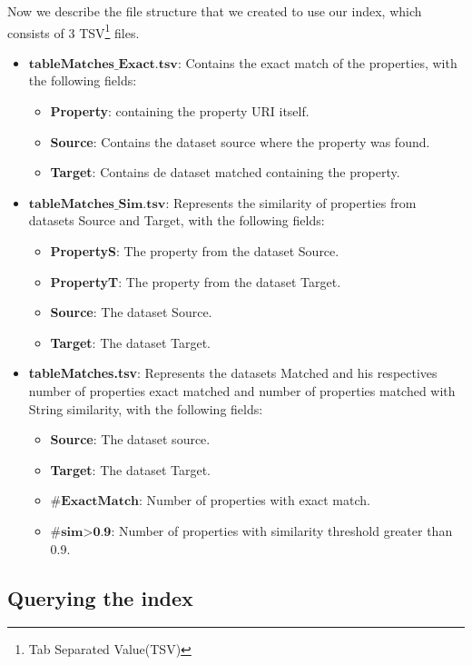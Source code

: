 Now we describe the file structure that we created to use our index, which consists of 3 TSV\footnote{Tab Separated Value(TSV)} files.
\begin{itemize}
    \item $\textbf{tableMatches\_Exact.tsv}$: Contains the exact match of the properties, with the following fields: 
    \begin{itemize}
        \item \textbf{Property}: containing the property URI itself.
        \item \textbf{Source}: Contains the dataset source where the property was found.
        \item \textbf{Target}: Contains de dataset matched containing the property.
    \end{itemize}
    \item $\textbf{tableMatches\_Sim.tsv}$: Represents the similarity of properties from datasets Source and Target, with the following fields:
    \begin{itemize}
        \item \textbf{PropertyS}: The property from the dataset Source.
        \item \textbf{PropertyT}: The property from the dataset Target.
        \item \textbf{Source}: The dataset Source.
        \item \textbf{Target}: The dataset Target.
    \end{itemize}
    \item \textbf{tableMatches.tsv}: Represents the datasets Matched and his respectives number of properties exact matched and number of properties matched with String similarity, with the following fields:
    \begin{itemize}
        \item \textbf{Source}: The dataset source.
        \item \textbf{Target}: The dataset Target.
        \item $\textbf{\#ExactMatch}$: Number of properties with exact match.
        \item $\textbf{\#sim>0.9}$: Number of properties with similarity threshold greater than 0.9.
    \end{itemize}
\end{itemize}

\subsection{Querying the index}

